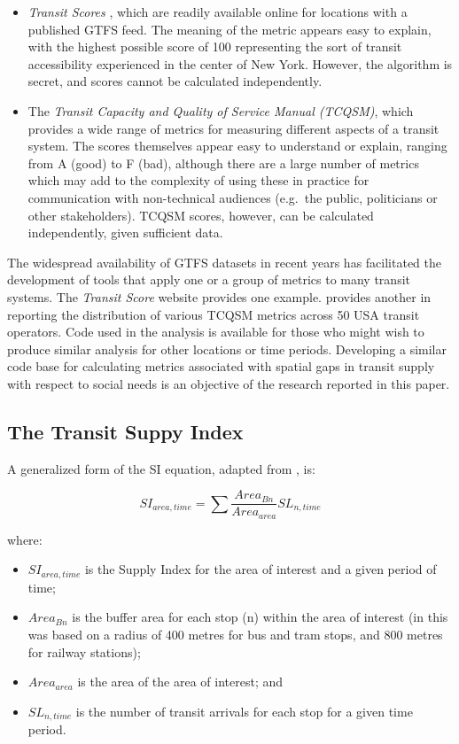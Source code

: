 \documentclass[preprint, 3p,
authoryear]{elsarticle} %
\begin{document}
\begin{itemize}
\item
  \emph{Transit Scores} \citep{WalkScore:2023tg}, which are readily
  available online for locations with a published GTFS feed. The meaning
  of the metric appears easy to explain, with the highest possible score
  of 100 representing the sort of transit accessibility experienced in
  the center of New York. However, the algorithm is secret, and scores
  cannot be calculated independently.
\item
  The \emph{Transit Capacity and Quality of Service Manual (TCQSM)},
  which provides a wide range of metrics for measuring different aspects
  of a transit system. The scores themselves appear easy to understand
  or explain, ranging from A (good) to F (bad), although there are a
  large number of metrics which may add to the complexity of using these
  in practice for communication with non-technical audiences (e.g.~the
  public, politicians or other stakeholders). TCQSM scores, however, can
  be calculated independently, given sufficient data.
\end{itemize}

The widespread availability of GTFS datasets in recent years has
facilitated the development of tools that apply one or a group of
metrics to many transit systems. The \emph{Transit Score} website
provides one example. \citet{Wong:2013aa} provides another in reporting
the distribution of various TCQSM metrics across 50 USA transit
operators. Code used in the \citet{Wong:2013aa} analysis is available
for those who might wish to produce similar analysis for other locations
or time periods. Developing a similar code base for calculating metrics
associated with spatial gaps in transit supply with respect to social
needs is an objective of the research reported in this paper.

\hypertarget{the-transit-suppy-index}{%
\subsection{The Transit Suppy Index}\label{the-transit-suppy-index}}

A generalized form of the SI equation, adapted from
\citet{currie2010identifying}, is:

\[SI_{area, time} = \sum{\frac{Area_{Bn}}{Area_{area}}SL_{n, time}}\]

where:

\begin{itemize}
\item
  \(SI_{area, time}\) is the Supply Index for the area of interest and a
  given period of time;
\item
  \(Area_{Bn}\) is the buffer area for each stop (n) within the area of
  interest (in \citet{currie2010identifying} this was based on a radius
  of 400 metres for bus and tram stops, and 800 metres for railway
  stations);
\item
  \(Area_{area}\) is the area of the area of interest; and
\item
  \(SL_{n,time}\) is the number of transit arrivals for each stop for a
  given time period.
\end{itemize}
\end{document}
